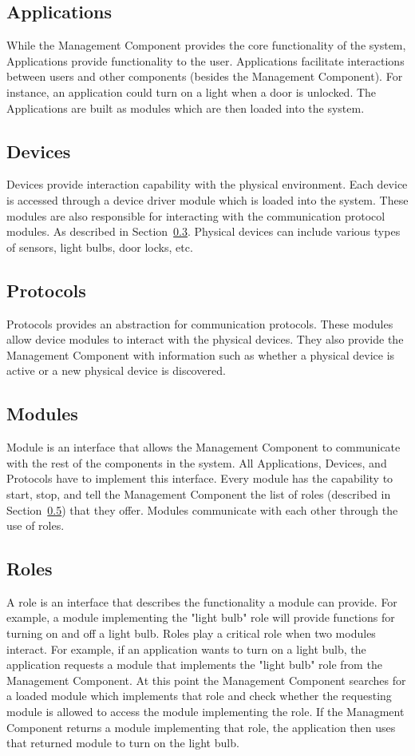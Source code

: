 \subsection{Applications}
\label{sec:apps}
While the Management Component provides the core functionality of the system,
Applications provide functionality to the user. Applications facilitate
interactions between users and other components (besides the Management
Component). For instance, an application could turn on a light when a door is
unlocked. The Applications are built as modules which are then loaded into the
system.
\subsection{Devices}
\label{sec:devices}
Devices provide interaction capability with the physical environment. Each
device is accessed through a device driver module which is loaded into the
system. These modules are also responsible for interacting with the
communication protocol modules. As described in Section~\ref{sec:protocols}.
Physical devices can include various types of sensors, light bulbs, door locks,
etc.
\subsection{Protocols}
\label{sec:protocols}
Protocols provides an abstraction for communication protocols. These modules
allow device modules to interact with the physical devices. They also provide
the Management Component with information such as whether a physical device is
active or a new physical device is discovered.
\subsection{Modules}
\label{sec:mods}
Module is an interface that allows the Management Component to communicate
with the rest of the components in the system. All Applications, Devices, and
Protocols have to implement this interface. Every module has the capability to
start, stop, and tell the Management Component the list of roles (described in 
Section~\ref{sec:roles}) that they offer. Modules communicate with each
other through the use of roles.
\subsection{Roles}
\label{sec:roles}
A role is an interface that describes the functionality a module can provide. 
For example, a module implementing the "light bulb" role will provide functions
for turning on and off a light bulb. Roles play a critical role when two
modules interact. For example, if an application wants to turn on a light bulb,
the application requests a module that implements the "light bulb" role from 
the Management Component. At this point the Management Component searches for a
loaded module which implements that role and check whether the requesting
module is allowed to access the module implementing the role. If the Managment
Component returns a module implementing that role, the application then uses
that returned module to turn on the light bulb.
